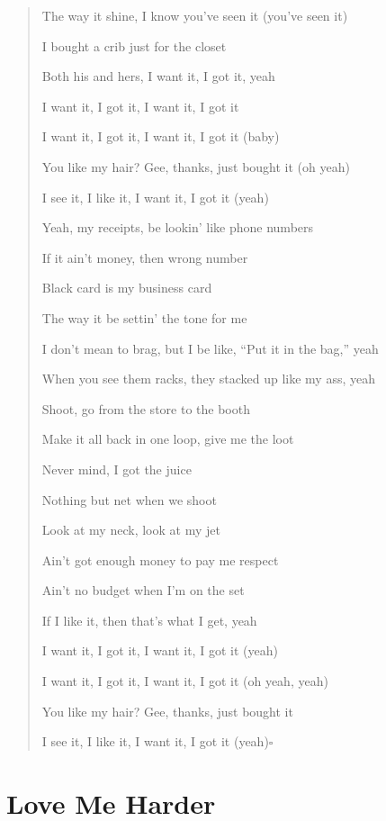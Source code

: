 \documentclass{book}
\numberwithin{equation}{section}
\begin{document}
\begin{quotation}
    The way it shine, I know you've seen it (you've seen it)
    
    I bought a crib just for the closet
    
    Both his and hers, I want it, I got it, yeah
    
    I want it, I got it, I want it, I got it
    
    I want it, I got it, I want it, I got it (baby)
    
    You like my hair? Gee, thanks, just bought it (oh yeah)
    
    I see it, I like it, I want it, I got it (yeah)
    
    Yeah, my receipts, be lookin' like phone numbers
    
    If it ain't money, then wrong number
    
    Black card is my business card
    
    The way it be settin' the tone for me
    
    I don't mean to brag, but I be like, ``Put it in the bag,'' yeah
    
    When you see them racks, they stacked up like my ass, yeah
    
    Shoot, go from the store to the booth
    
    Make it all back in one loop, give me the loot
    
    Never mind, I got the juice
    
    Nothing but net when we shoot
    
    Look at my neck, look at my jet
    
    Ain't got enough money to pay me respect
    
    Ain't no budget when I'm on the set
    
    If I like it, then that's what I get, yeah
    
    I want it, I got it, I want it, I got it (yeah)
    
    I want it, I got it, I want it, I got it (oh yeah, yeah)
    
    You like my hair? Gee, thanks, just bought it
    
    I see it, I like it, I want it, I got it (yeah)\hfill$\square$
\end{quotation}

\section{Love Me Harder}
\end{document}
